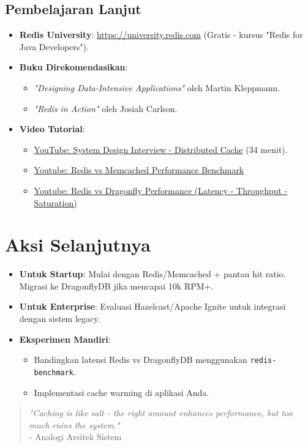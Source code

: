 \documentclass[11pt, a4paper]{book}
\begin{document}
	\subsection{Pembelajaran Lanjut}
	\label{subsec:pembelajaran}
	
	\begin{itemize}
		\item \textbf{Redis University}:  
		\href{https://university.redis.com}{https://university.redis.com} (Gratis - kursus "Redis for Java Developers").
		
		\item \textbf{Buku Direkomendasikan}:  
		\begin{itemize}
			\item \textit{"Designing Data-Intensive Applications"} oleh Martin Kleppmann.
			\item \textit{"Redis in Action"} oleh Josiah Carlson.
		\end{itemize}
		
		\item \textbf{Video Tutorial}:  
		\begin{itemize}
			\item \href{https://www.youtube.com/watch?v=iuqZvajTOyA}{YouTube: System Design Interview - Distributed Cache} (34 menit).
			\item \href{https://www.youtube.com/watch?v=hPRqxKVnpw8}{Youtube: Redis vs Memcached Performance Benchmark}
			\item \href{https://www.youtube.com/watch?v=DgcBFb4L0dI}{Youtube: Redis vs Dragonfly Performance (Latency - Throughput - Saturation)}
		\end{itemize}
	\end{itemize}
	
	\section*{Aksi Selanjutnya}
	\label{sec:aksi}
	
	\begin{itemize}
		\item \textbf{Untuk Startup}:  
		Mulai dengan Redis/Memcached + pantau hit ratio. Migrasi ke DragonflyDB jika mencapai 10k RPM+.
		
		\item \textbf{Untuk Enterprise}:  
		Evaluasi Hazelcast/Apache Ignite untuk integrasi dengan sistem legacy.
		
		\item \textbf{Eksperimen Mandiri}:  
		\begin{itemize}
			\item Bandingkan latensi Redis vs DragonflyDB menggunakan \texttt{redis-benchmark}.
			\item Implementasi cache warming di aplikasi Anda.
		\end{itemize}
	\end{itemize}
	
	\begin{quote}
		\textit{"Caching is like salt - the right amount enhances performance, but too much ruins the system."} \\
		- Analogi Arsitek Sistem
	\end{quote}
	
\end{document}
